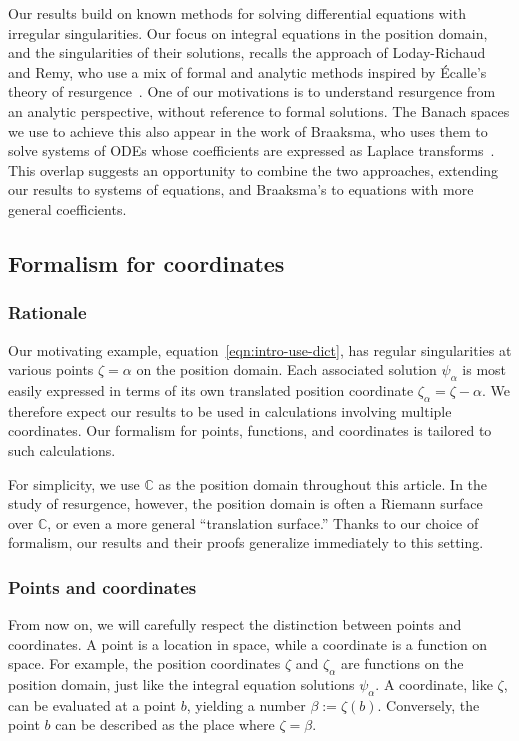 \documentclass[final]{siamart220329}
\newcommand{\C}{\mathbb{C}}
\begin{document}
Our results build on known methods for solving differential equations with irregular singularities. Our focus on integral equations in the position domain, and the singularities of their solutions, recalls the approach of Loday-Richaud and Remy, who use a mix of formal and analytic methods inspired by \'{E}calle's theory of resurgence~\cite{loday-Remy2011, EcalleIII}. One of our motivations is to understand resurgence from an analytic perspective, without reference to formal solutions. The Banach spaces we use to achieve this also appear in the work of Braaksma, who uses them to solve systems of ODEs whose coefficients are expressed as Laplace transforms~\cite{braaksma2006laplace}. This overlap suggests an opportunity to combine the two approaches, extending our results to systems of equations, and Braaksma's to equations with more general coefficients.
\subsection{Formalism for coordinates}\label{sec:formalism}
\subsubsection{Rationale}
Our motivating example, equation~\eqref{eqn:intro-use-dict}, has regular singularities at various points $\zeta = \alpha$ on the position domain. Each associated solution $\psi_\alpha$ is most easily expressed in terms of its own translated position coordinate $\zeta_\alpha = \zeta - \alpha$. We therefore expect our results to be used in calculations involving multiple coordinates. Our formalism for points, functions, and coordinates is tailored to such calculations.

For simplicity, we use $\C$ as the position domain throughout this article. In the study of resurgence, however, the position domain is often a Riemann surface over $\C$, or even a more general ``translation surface.'' Thanks to our choice of formalism, our results and their proofs generalize immediately to this setting.
\subsubsection{Points and coordinates}
From now on, we will carefully respect the distinction between points and coordinates. A point is a location in space, while a coordinate is a function on space. For example, the position coordinates $\zeta$ and $\zeta_\alpha$ are functions on the position domain, just like the integral equation solutions $\psi_\alpha$. A coordinate, like $\zeta$, can be evaluated at a point $b$, yielding a number $\beta := \zeta(b)$. Conversely, the point $b$ can be described as the place where $\zeta = \beta$.
\end{document}
